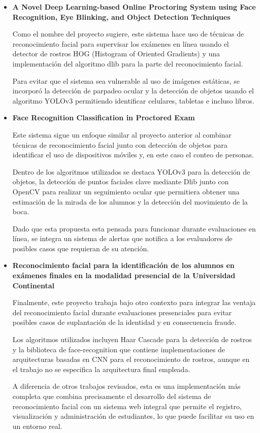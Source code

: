\begin{itemize}
	
	\item \textbf{A Novel Deep Learning-based Online Proctoring System using Face Recognition, Eye Blinking, and Object Detection Techniques \cite{EA4}}
	
	Como el nombre del proyecto sugiere, este sistema hace uso de técnicas de reconocimiento facial para supervisar los exámenes en línea usando el detector de rostros HOG (Histogram of Oriented Gradients) y una implementación del algoritmo dlib para la parte del reconocimiento facial.
	
	Para evitar que el sistema sea vulnerable al uso de imágenes estáticas, se incorporó la detección de parpadeo ocular y la detección de objetos usando el algoritmo YOLOv3 permitiendo identificar celulares, tabletas e incluso libros.
	
	\item \textbf{Face Recognition Classification in Proctored Exam \cite{EA5}}
	
	Este sistema sigue un enfoque similar al proyecto anterior al combinar técnicas de reconocimiento facial junto con detección de objetos para identificar el uso de dispositivos móviles y, en este caso el conteo de personas.
	
	Dentro de los algoritmos utilizados se destaca YOLOv3 para la detección de objetos, la detección de puntos faciales clave mediante Dlib junto con OpenCV para realizar un seguimiento ocular que permitiera obtener una estimación de la mirada de los alumnos y la detección del movimiento de la boca.
	
	Dado que esta propuesta esta pensada para funcionar durante evaluaciones en línea, se integra un sistema de alertas que notifica a los evaluadores de posibles casos que requieran de su atención.
	
	
	\item \textbf{Reconocimiento facial para la identificación de los alumnos en exámenes finales en la modalidad presencial de la Universidad Continental \cite{EA6}}
	
	Finalmente, este proyecto trabaja bajo otro contexto para integrar las ventaja del reconocimiento facial durante evaluaciones presenciales para evitar posibles casos de suplantación de la identidad y en consecuencia fraude.
	
	Los algoritmos utilizados incluyen Haar Cascade para la detección de rostros y la biblioteca de face-recognition que contiene implementaciones de arquitecturas basadas en CNN para el reconocimiento de rostros, aunque en el trabajo no se especifica la arquitectura final empleada.
	
	A diferencia de otros trabajos revisados, esta es una implementación más completa que combina precisamente el desarrollo del sistema de reconocimiento facial con un sistema web integral que permite el registro, visualización y administración de estudiantes, lo que puede facilitar su uso en un entorno real.
	
\end{itemize}


